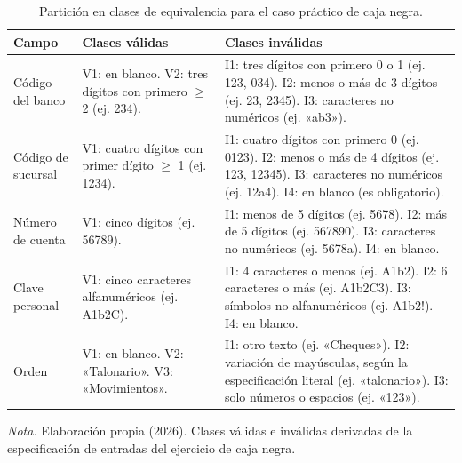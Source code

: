 \begin{table}[H]
  \centering
  \small
  \caption{Partición en clases de equivalencia para el caso práctico de caja negra.}
  \label{tab:pruebas_clases_equiv}
  \begin{tabularx}{\linewidth}{|L{2.6cm}|Y|Y|}
    \hline
    \textbf{Campo} & \textbf{Clases válidas} & \textbf{Clases inválidas} \\ \hline
    Código del banco
      & V1: en blanco. \newline V2: tres dígitos con primero $\geq$ 2 (ej. 234).
      & I1: tres dígitos con primero 0 o 1 (ej. 123, 034). \newline I2: menos o más de 3 dígitos (ej. 23, 2345). \newline I3: caracteres no numéricos (ej. «ab3»). \\ \hline
    Código de sucursal
      & V1: cuatro dígitos con primer dígito $\geq$ 1 (ej. 1234).
      & I1: cuatro dígitos con primero 0 (ej. 0123). \newline I2: menos o más de 4 dígitos (ej. 123, 12345). \newline I3: caracteres no numéricos (ej. 12a4). \newline I4: en blanco (es obligatorio). \\ \hline
    Número de cuenta
      & V1: cinco dígitos (ej. 56789).
      & I1: menos de 5 dígitos (ej. 5678). \newline I2: más de 5 dígitos (ej. 567890). \newline I3: caracteres no numéricos (ej. 5678a). \newline I4: en blanco. \\ \hline
    Clave personal
      & V1: cinco caracteres alfanuméricos (ej. A1b2C).
      & I1: 4 caracteres o menos (ej. A1b2). \newline I2: 6 caracteres o más (ej. A1b2C3). \newline I3: símbolos no alfanuméricos (ej. A1b2!). \newline I4: en blanco. \\ \hline
    Orden
      & V1: en blanco. \newline V2: «Talonario». \newline V3: «Movimientos».
      & I1: otro texto (ej. «Cheques»). \newline I2: variación de mayúsculas, según la especificación literal (ej. «talonario»). \newline I3: solo números o espacios (ej. «123»). \\ \hline
  \end{tabularx}
  \par\vspace{0.2cm}
  {\raggedright \small \emph{Nota.} Elaboración propia (2026). Clases válidas e inválidas derivadas de la especificación de entradas del ejercicio de caja negra.\par}
\end{table}

